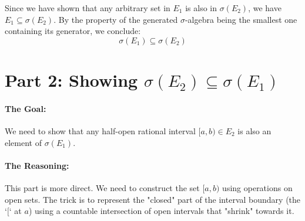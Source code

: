 \documentclass[11pt,a4paper]{article}
\theoremstyle{tutorstyle}
\begin{document}
Since we have shown that any arbitrary set in $E_1$ is also in $\sigma(E_2)$, we have $E_1 \subseteq \sigma(E_2)$. By the property of the generated $\sigma$-algebra being the smallest one containing its generator, we conclude:
\[ \sigma(E_1) \subseteq \sigma(E_2) \]

\section*{Part 2: Showing $\sigma(E_2) \subseteq \sigma(E_1)$}

\paragraph{The Goal:} We need to show that any half-open rational interval $[a,b) \in E_2$ is also an element of $\sigma(E_1)$.

\paragraph{The Reasoning:}
This part is more direct. We need to construct the set $[a,b)$ using operations on open sets. The trick is to represent the "closed" part of the interval boundary (the `$[$` at $a$) using a countable intersection of open intervals that "shrink" towards it.
\end{document}
